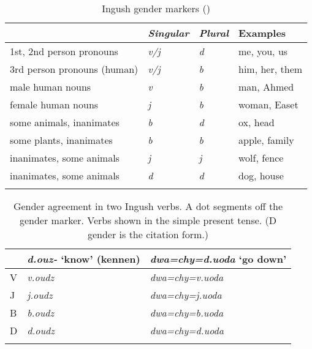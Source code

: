 \documentclass[output=collectionpaper]{langsci/langscibook}
\begin{document}
\begin{table}[t]
\caption{Ingush gender markers (\citealt[144]{Nichols2011})}
\label{extab:Nich:6}
\begin{tabularx}{\textwidth}{l>{\itshape}X>{\itshape}Xl}
\lsptoprule
					 &	{\normalfont Singular} &	{\normalfont Plural} &	{\normalfont Examples} \\
			 \midrule
1st, 2nd person pronouns & 			v/j	 &	d  &		me, you, us \\
3rd person pronouns (human) 	 &	v/j	 &	b 	 &	him, her, them \\
male human nouns 			 &	v 	 &	b 	 &	man, Ahmed \\
female human nouns			  &	j 	 &	b 	 &	woman, Easet \\
some animals, inanimates 		 &	b  &		d  &		ox, head \\
some plants, inanimates	 &		b 		 &b	 &	apple, family \\
inanimates, some animals  &			j 	 &	j  &		wolf, fence \\
inanimates, some animals  &			d 	 &	d  &		dog, house \\
\lspbottomrule
\end{tabularx}
\end{table}


\begin{table}[t]
\caption{Gender agreement in two Ingush verbs. A dot segments off the gender marker. Verbs shown in the simple present tense. (D gender is the citation form.)}
\label{extab:Nich:7}

\begin{tabularx}{\textwidth}{Xll}
\lsptoprule
	 &	{\itshape d.ouz-} `know' (kennen) &	{\itshape dwa=chy=d.uoda} `go down' \\
			 \midrule
	V &	\itshape v.oudz &				\itshape dwa=chy=v.uoda \\
	J &	\itshape  j.oudz &				\itshape dwa=chy=j.uoda \\
	B &	\itshape b.oudz &				\itshape dwa=chy=b.uoda \\
	D &	\itshape d.oudz &				\itshape dwa=chy=d.uoda \\
\lspbottomrule\end{tabularx}
\end{table}
\end{document}
